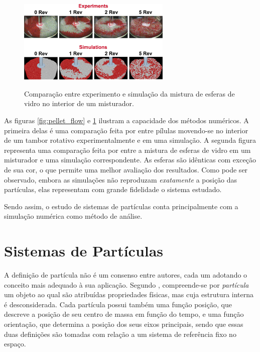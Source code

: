 \begin{figure}[h]
	\caption{Comparação entre experimento e simulação da mistura de esferas de vidro no interior de um misturador.}
	\vspace{-0.5cm}
	\centering
		\includegraphics[width=0.65\textwidth]{images/introduction/drug_production.png}
	\vspace{-0.2cm}
	\label{fig:drug_production}
	\vspace{-1cm}
\end{figure}

As figuras \ref{fig:pellet_flow} e \ref{fig:drug_production} ilustram a capacidade dos métodos numéricos. A primeira delas é uma comparação feita por  entre pílulas movendo-se no interior de um tambor rotativo experimentalmente e em uma simulação. A segunda figura representa uma comparação feita por  entre a mistura de esferas de vidro em um misturador e uma simulação correspondente. As esferas são idênticas com exceção de sua cor, o que permite uma melhor avaliação dos resultados. Como pode ser observado, embora as simulações não reproduzam \textit{exatamente} a posição das partículas, elas representam com grande fidelidade o sistema estudado.

Sendo assim, o estudo de sistemas de partículas conta principalmente com a simulação numérica como método de análise.
 
\section{Sistemas de Partículas}

A definição de partícula não é um consenso entre autores, cada um adotando o conceito mais adequado à sua aplicação. Segundo , compreende-se por \textit{partícula} um objeto ao qual são atribuídas propriedades físicas, mas cuja estrutura interna é desconsiderada. Cada partícula possui também uma função posição, que descreve a posição de seu centro de massa em função do tempo, e uma função orientação, que determina a posição dos seus eixos principais, sendo que essas duas definições são tomadas com relação a um sistema de referência fixo no espaço.

